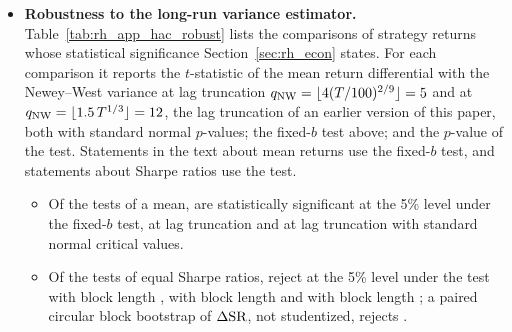 \begin{itemize}
\item \textbf{Robustness to the long-run variance estimator.} Table~\ref{tab:rh_app_hac_robust} lists the comparisons of strategy returns whose statistical significance Section~\ref{sec:rh_econ} states. For each comparison it reports the $t$-statistic of the mean return differential with the Newey--West variance at lag truncation $q_{\mathrm{NW}} = \lfloor 4 (T/100)^{2/9} \rfloor = 5$ \citep{NeweyWest1994} and at $q_{\mathrm{NW}} = \lfloor 1.5\, T^{1/3} \rfloor = 12$, the lag truncation of an earlier version of this paper, both with standard normal $p$-values; the fixed-$b$ test above; and the $p$-value of the \citet{LedoitWolf2008} test. Statements in the text about mean returns use the fixed-$b$ test, and statements about Sharpe ratios use the \citet{LedoitWolf2008} test.
  \begin{itemize}
  \item Of the \rhrRobN{} tests of a mean, \rhrRobFbSig{} are statistically significant at the 5\% level under the fixed-$b$ test, \rhrRobNWFiveSig{} at lag truncation \rhrRobLagNW{} and \rhrRobNWTwelveSig{} at lag truncation \rhrRobLagOld{} with standard normal critical values.
  \item Of the \rhrRobNPairs{} tests of equal Sharpe ratios, \rhrRobLWSig{} reject at the 5\% level under the \citet{LedoitWolf2008} test with block length \rheLWBlock{}, \rhrRobLWSigLo{} with block length \rheLWBlockLo{} and \rhrRobLWSigHi{} with block length \rheLWBlockHi{}; a paired circular block bootstrap of $\Delta\mathrm{SR}$, not studentized, rejects \rhrRobBootSig.

\end{itemize}
\end{itemize}
